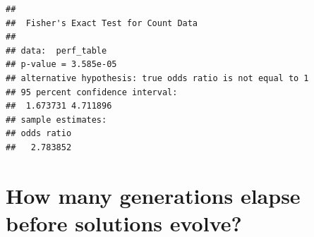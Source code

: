 \documentclass[]{book}
\newenvironment{Shaded}{\begin{snugshade}}{\end{snugshade}}
\newcommand{\DecValTok}[1]{\textcolor[rgb]{0.00,0.00,0.81}{#1}}
\newcommand{\KeywordTok}[1]{\textcolor[rgb]{0.13,0.29,0.53}{\textbf{#1}}}
\newcommand{\NormalTok}[1]{#1}
\newcommand{\OperatorTok}[1]{\textcolor[rgb]{0.81,0.36,0.00}{\textbf{#1}}}
\newcommand{\StringTok}[1]{\textcolor[rgb]{0.31,0.60,0.02}{#1}}
\begin{document}
\begin{verbatim}
## 
##  Fisher's Exact Test for Count Data
## 
## data:  perf_table
## p-value = 3.585e-05
## alternative hypothesis: true odds ratio is not equal to 1
## 95 percent confidence interval:
##  1.673731 4.711896
## sample estimates:
## odds ratio 
##   2.783852
\end{verbatim}

\hypertarget{how-many-generations-elapse-before-solutions-evolve-2}{%
\section{How many generations elapse before solutions evolve?}\label{how-many-generations-elapse-before-solutions-evolve-2}}

\begin{Shaded}
\end{Shaded}
\end{document}
